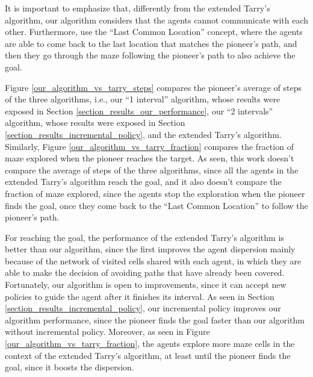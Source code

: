 It is important to emphasize that, differently from the extended Tarry's algorithm, our algorithm considers that the agents cannot communicate with each other. Furthermore,  use the ``Last Common Location'' concept, where the agents are able to come back to the last location that matches the pioneer's path, and then they go through the maze following the pioneer's path to also achieve the goal.

Figure \ref{our_algorithm_vs_tarry_steps} compares the pioneer's average of steps of the three algorithms, i.e., our ``1 interval'' algorithm, whose results were exposed in Section \ref{section_results_our_performance}, our ``2 intervals'' algorithm, whose results were exposed in Section \ref{section_results_incremental_policy}, and the extended Tarry's algorithm. Similarly, Figure \ref{our_algorithm_vs_tarry_fraction} compares the fraction of maze explored when the pioneer reaches the target. As seen, this work doesn't compare the average of steps of the three algorithms, since all the agents in the extended Tarry's algorithm reach the goal, and it also doesn't compare the fraction of maze explored, since the agents stop the exploration when the pioneer finds the goal, once they come back to the ``Last Common Location'' to follow the pioneer's path.

For reaching the goal, the performance of the extended Tarry's algorithm is better than our algorithm, since the first improves the agent dispersion mainly because of the network of visited cells shared with each agent, in which they are able to make the decision of avoiding paths that have already been covered. Fortunately, our algorithm is open to improvements, since it can accept new policies to guide the agent after it finishes its interval. As seen in Section \ref{section_results_incremental_policy}, our incremental policy improves our algorithm performance, since the pioneer finds the goal faster than our algorithm without incremental policy. Moreover, as seen in Figure \ref{our_algorithm_vs_tarry_fraction}, the agents explore more maze cells in the context of the extended Tarry's algorithm, at least until the pioneer finds the goal, since it boosts the dispersion.

